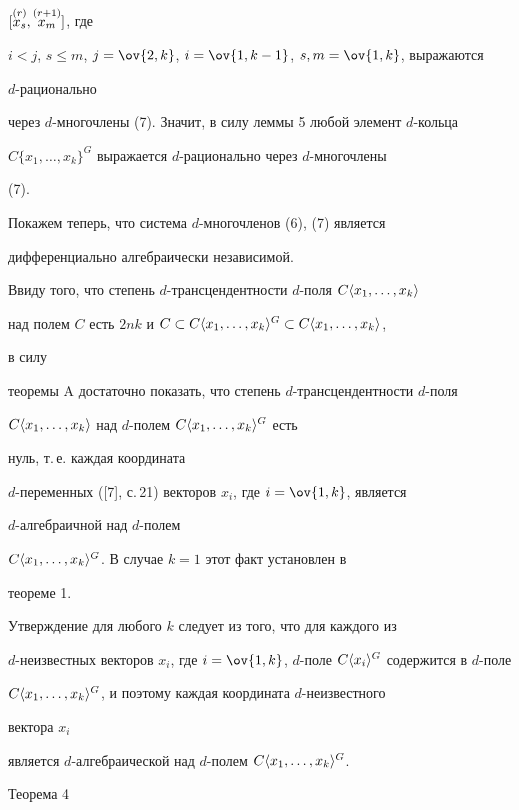 $[\overset{(r)}{x_s}{},\overset{(r+1)}{x_m}{}]$, где


$i<j$, $s\le m$, $j=\ov{2,k}$, $i=\ov{1,k-1}$, $s,m=\ov{1,k}$, выражаются 


$d$-рационально 


через $d$-многочлены (7). Значит, в силу леммы 5 любой элемент $d$-кольца 


$C\{x_1,\dotsc,x_k\}^G$ выражается $d$-рационально через $d$-многочлены 


(7).





Покажем теперь, что система $d$-многочленов (6), (7) является 


дифференциально алгебраически независимой.





Ввиду того, что степень $d$-трансцендентности $d$-поля $C\la 


x_1,\dotsc,x_k\ra$


над полем $C$ есть $2nk$ и $C\subset C\la x_1,\dotsc,x_k\ra^G\subset 


C\la x_1,\dotsc,x_k\ra$,


в силу 


теоремы A достаточно показать, что степень $d$-трансцендентности $d$-поля 


$C\langle x_1,\dotsc,x_k\rangle$ над $d$-полем $C\langle x_1,\dotsc,x_k\rangle^G$ есть 


нуль, т.\,е. каждая координата


$d$-переменных ([7], с.\,21) векторов $x_i$, где $i=\ov{1,k}$, является 


$d$-алгебраичной над $d$-полем 


$C\langle x_1,\dotsc,x_k\rangle^G$. В случае $k=1$ этот факт установлен в 


теореме 1.





Утверждение для любого $k$ следует из того, что для каждого из


$d$-неизвестных векторов $x_i$, где $i=\ov{1,k}$, $d$-поле $C\la 


x_i\ra^G$ содержится в $d$-поле 


$C\langle x_1,\dotsc,x_k\rangle^G$, и поэтому каждая координата $d$-неизвестного 


вектора $x_i$


является $d$-алгебраической над $d$-полем $C\langle x_1,\dotsc,x_k\rangle^G$. 


Теорема 4 


